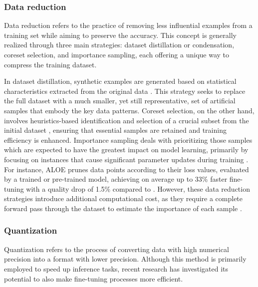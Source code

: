     \subsubsection{Data reduction}
        Data reduction refers to the practice of removing less influential examples from a training set while aiming to preserve the \llm{} accuracy. This concept is generally realized through three main strategies: dataset distillation or condensation, coreset selection, and importance sampling, each offering a unique way to compress the training dataset.

        In dataset distillation, synthetic examples are generated based on statistical characteristics extracted from the original data \cite{cazenavette2022datasetdistillationmatchingtraining}. This strategy seeks to replace the full dataset with a much smaller, yet still representative, set of artificial samples that embody the key data patterns. Coreset selection, on the other hand, involves heuristics-based identification and selection of a crucial subset from the initial dataset \cite{shim2021coresetsamplingefficientneural}, ensuring that essential samples are retained and training efficiency is enhanced. Importance sampling deals with prioritizing those samples which are expected to have the greatest impact on model learning, primarily by focusing on instances that cause significant parameter updates during training \cite{jiang2019acceleratingdeeplearningfocusing}. For instance, ALOE \cite{aloe} prunes data points according to their loss values, evaluated by a trained or pre-trained model, achieving on average up to 33\% faster fine-tuning with a quality drop of 1.5\% compared to \lora{}. However, these data reduction strategies introduce additional computational cost, as they require a complete forward pass through the dataset to estimate the importance of each sample \cite{NEURIPS2018_967990de}.  

    \subsubsection{Quantization}
        Quantization refers to the process of converting data with high numerical precision into a format with lower precision. Although this method is primarily employed to speed up inference tasks, recent research has investigated its potential to also make fine-tuning processes more efficient.

